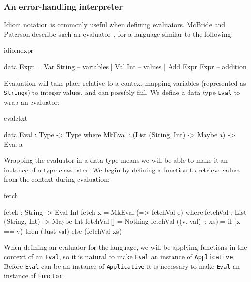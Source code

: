 \subsubsection{An error-handling interpreter}

Idiom notation is commonly useful when defining evaluators. McBride and
Paterson describe such an evaluator~\cite{idioms}, for a language similar to
the following:

\begin{SaveVerbatim}{idiomexpr}

data Expr = Var String      -- variables
          | Val Int         -- values
          | Add Expr Expr   -- addition

\end{SaveVerbatim}

\noindent
Evaluation will take place relative to a context mapping variables (represented as
\texttt{String}s) to integer values, and can possibly fail. We define a data type
\texttt{Eval} to wrap an evaluator:

\begin{SaveVerbatim}{evalctxt}

data Eval : Type -> Type where
     MkEval : (List (String, Int) -> Maybe a) -> Eval a

\end{SaveVerbatim}

\noindent
Wrapping the evaluator in a data type means we will be able to make it an instance
of a type class later. We begin by defining a function to retrieve values from
the context during evaluation:

\begin{SaveVerbatim}{fetch}

fetch : String -> Eval Int
fetch x = MkEval (\e => fetchVal e) where
    fetchVal : List (String, Int) -> Maybe Int
    fetchVal [] = Nothing
    fetchVal ((v, val) :: xs) = if (x == v) then (Just val) else (fetchVal xs)
  
\end{SaveVerbatim}
  
\noindent
When defining an evaluator for the language, we will be applying functions in the
context of an \texttt{Eval}, so it is natural to make \texttt{Eval} an instance
of \texttt{Applicative}. Before \texttt{Eval} can be an instance of
\texttt{Applicative} it is necessary to make \texttt{Eval} an instance of
\texttt{Functor}:

\useverb{}

